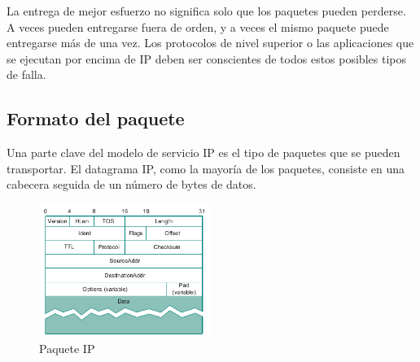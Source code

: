 La entrega de mejor esfuerzo no significa solo que los paquetes pueden perderse. A veces pueden entregarse fuera de orden, y a veces el mismo paquete puede entregarse más de una vez. Los protocolos de nivel superior o las aplicaciones que se ejecutan por encima de IP deben ser conscientes de todos estos posibles tipos de falla.

\subsection{Formato del paquete}
Una parte clave del modelo de servicio IP es el tipo de paquetes que se pueden transportar. El datagrama IP, como la mayoría de los paquetes, consiste en una cabecera seguida de un número de bytes de datos.


\begin{figure}[H]
	\centering
	\includegraphics[width=0.5\textwidth
]{images/ip-frame.png}
	\caption[Paquete IP]{Paquete IP}
	\label{fig:ip-frame}
\end{figure}

